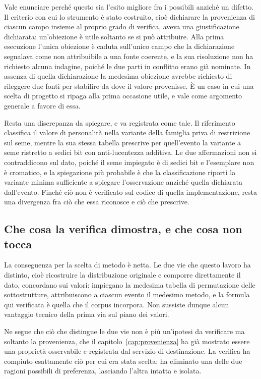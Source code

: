 Vale enunciare perché questo sia l'esito migliore fra i possibili anziché un difetto. Il criterio con cui lo strumento è stato costruito, cioè dichiarare la provenienza di ciascun campo insieme al proprio grado di verifica, aveva una giustificazione dichiarata: un'obiezione è utile soltanto se si può attribuire. Alla prima esecuzione l'unica obiezione è caduta sull'unico campo che la dichiarazione segnalava come non attribuibile a una fonte coerente, e la sua risoluzione non ha richiesto alcuna indagine, poiché le due parti in conflitto erano già nominate. In assenza di quella dichiarazione la medesima obiezione avrebbe richiesto di rileggere due fonti per stabilire da dove il valore provenisse. È un caso in cui una scelta di progetto si ripaga alla prima occasione utile, e vale come argomento generale a favore di essa.

Resta una discrepanza da spiegare, e va registrata come tale. Il riferimento classifica il valore di personalità nella variante della famiglia priva di restrizione sul seme, mentre la sua stessa tabella prescrive per quell'evento la variante a seme ristretto a sedici bit con anti-lucentezza additiva. Le due affermazioni non si contraddicono sul dato, poiché il seme impiegato è di sedici bit e l'esemplare non è cromatico, e la spiegazione più probabile è che la classificazione riporti la variante minima sufficiente a spiegare l'osservazione anziché quella dichiarata dall'evento. Finché ciò non è verificato sul codice di quella implementazione, resta una divergenza fra ciò che essa riconosce e ciò che prescrive.

\subsection*{Che cosa la verifica dimostra, e che cosa non tocca}

La conseguenza per la scelta di metodo è netta. Le due vie che questo lavoro ha distinto, cioè ricostruire la distribuzione originale e comporre direttamente il dato, concordano sui valori: impiegano la medesima tabella di permutazione delle sottostrutture, attribuiscono a ciascun evento il medesimo metodo, e la formula qui verificata è quella che il corpus incorpora. Non sussiste dunque alcun vantaggio tecnico della prima via sul piano dei valori.

Ne segue che ciò che distingue le due vie non è più un'ipotesi da verificare ma soltanto la provenienza, che il capitolo~\ref{cap:provenienza} ha già mostrato essere una proprietà osservabile e registrata dal servizio di destinazione. La verifica ha compiuto esattamente ciò per cui era stata scelta: ha eliminato una delle due ragioni possibili di preferenza, lasciando l'altra intatta e isolata.

